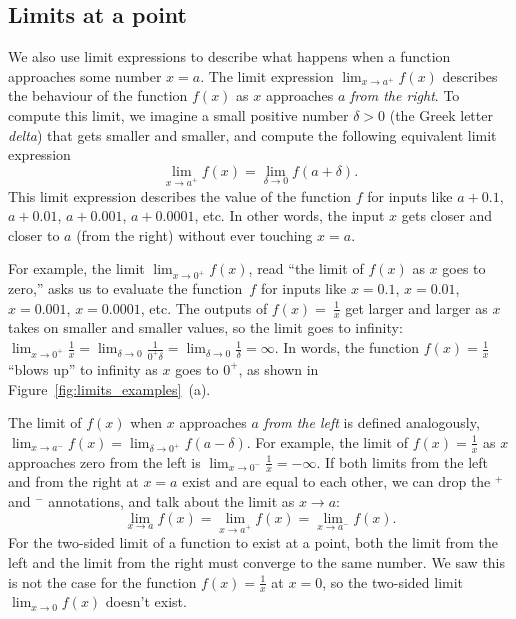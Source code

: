 	\subsection{Limits at a point}
	\label{limits:limits_at_a_point}

		We also use limit expressions to describe what happens
		when a function approaches some number $x=a$.
		The limit expression $\lim_{x \to a^+} f(x)$
		describes the behaviour of the function $f(x)$
		as $x$ approaches $a$ \emph{from the right}.
		To compute this limit,
		we imagine a small positive number $\delta > 0$ (the Greek letter \emph{delta})
		that gets smaller and smaller,
		and compute the following equivalent limit expression
		\[
			\lim_{x\to a^+} f(x) = \lim_{\delta \to 0} f(a + \delta).
		\]
		This limit expression describes the value of the function $f$
		for inputs like $a+0.1$, $a+0.01$, $a+0.001$, $a+0.0001$, etc.
		In other words,
		the input $x$ gets closer and closer to $a$ (from the right)
		without ever touching $x=a$.

		For example,
		the limit $\lim_{x \to 0^+} f(x)$,
		read ``the limit of $f(x)$ as $x$ goes to zero,''
		asks us to evaluate the function~$f$ for inputs like
		$x=0.1$, $x=0.01$, $x=0.001$, $x=0.0001$, etc.
		The outputs of $f(x) =~\frac{1}{x}$ get larger and larger
		as $x$ takes on smaller and smaller values,
		so the limit goes to infinity:
		$\lim_{x\to 0^+} \tfrac{1}{x}
			= \lim_{\delta \to 0} \tfrac{1}{0^+\delta}
			= \lim_{\delta \to 0} \tfrac{1}{\delta} = \infty$.	
		In words,
		the function $f(x) = \frac{1}{x}$ ``blows up'' to infinity as $x$ goes to $0^+$,
		as shown in Figure~\ref{fig:limits_examples}~(a).

		The limit of $f(x)$ when $x$ approaches $a$ \emph{from the left}
		is defined analogously,
		$\lim_{x\to a^-} f(x)  = \lim_{\delta \to 0^+} f(a - \delta)$.
		For example,
		the limit of $f(x) = \frac{1}{x}$
		as $x$ approaches zero from the left
		is $\lim_{x \to 0^-} \frac{1}{x} = -\infty$.
		If both limits from the left and from the right at $x=a$
		exist and are equal to each other,
		we can drop the $^+$ and $^-$ annotations,
		and talk about the limit as $x\to a$:
		\[
			\lim_{x\to a} f(x) =  \lim_{x\to a^+} f(x) =  \lim_{x\to a^-} f(x).
		\]
		For the two-sided limit of a function to exist at a point,
		both the limit from the left and the limit from the right must converge to the same number.
		We saw this  is not the case for the function $f(x) = \frac{1}{x}$ at $x=0$,
		so the two-sided limit $\lim_{x\to 0} f(x)$ doesn't exist.






